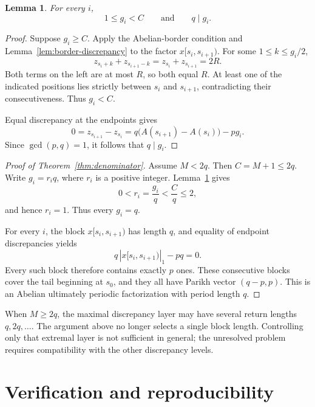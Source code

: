 \documentclass[11pt]{article}
\newtheorem{lemma}[theorem]{Lemma}
\begin{document}
\begin{lemma}\label{lem:gaps}
For every $i$,
\[
1\le g_i<C
\qquad\text{and}\qquad
q\mid g_i.
\]
\end{lemma}

\begin{proof}
Suppose $g_i\ge C$. Apply the Abelian-border condition and
Lemma~\ref{lem:border-discrepancy} to the factor $x[s_i,s_{i+1})$. For some
$1\le k\le g_i/2$,
\[
z_{s_i+k}+z_{s_{i+1}-k}=z_{s_i}+z_{s_{i+1}}=2R.
\]
Both terms on the left are at most $R$, so both equal $R$. At least one of
the indicated positions lies strictly between $s_i$ and $s_{i+1}$,
contradicting their consecutiveness. Thus $g_i<C$.

Equal discrepancy at the endpoints gives
\[
0=z_{s_{i+1}}-z_{s_i}
=q\bigl(A(s_{i+1})-A(s_i)\bigr)-pg_i.
\]
Since $\gcd(p,q)=1$, it follows that $q\mid g_i$.
\end{proof}

\begin{proof}[Proof of Theorem~\ref{thm:denominator}]
Assume $M<2q$. Then $C=M+1\le2q$. Write $g_i=r_iq$, where $r_i$ is a
positive integer. Lemma~\ref{lem:gaps} gives
\[
0<r_i=\frac{g_i}{q}<\frac{C}{q}\le2,
\]
and hence $r_i=1$. Thus every $g_i=q$.

For every $i$, the block $x[s_i,s_{i+1})$ has length $q$, and equality of
endpoint discrepancies yields
\[
q\,|x[s_i,s_{i+1})|_1-pq=0.
\]
Every such block therefore contains exactly $p$ ones. These consecutive
blocks cover the tail beginning at $s_0$, and they all have Parikh vector
$(q-p,p)$. This is an Abelian ultimately periodic factorization with period
length $q$.
\end{proof}

When $M\ge2q$, the maximal discrepancy layer may have several return lengths
$q,2q,\ldots$. The argument above no longer selects a single block length.
Controlling only that extremal layer is not sufficient in general; the
unresolved problem requires compatibility with the other discrepancy levels.

\section{Verification and reproducibility}\label{sec:verification}
\end{document}

